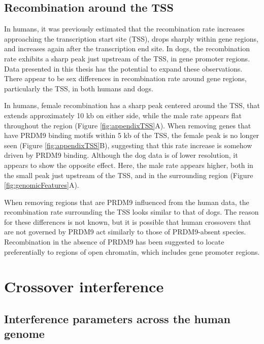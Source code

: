 \subsection{Recombination around the TSS}

In humans, it was previously estimated that the recombination rate increases approaching the transcription start site (TSS), drops sharply within gene regions, and increases again after the transcription end site\cite{Mcvean2004,Myers2005,hapmap2007,Spencer2006,Kong2010}.
In dogs, the recombination rate exhibits a sharp peak just upstream of the TSS, in gene promoter regions\cite{Auton2013}.
Data presented in this thesis has the potential to expand these observations.
There appear to be sex differences in recombination rate around gene regions, particularly the TSS, in both humans and dogs.

In humans, female recombination has a sharp peak centered around the TSS, that extends approximately 10 kb on either side, while the male rate appears flat throughout the region (Figure \ref{fig:appendixTSS}A).
When removing genes that have PRDM9 binding motifs within 5 kb of the TSS, the female peak is no longer seen (Figure \ref{fig:appendixTSS}B), suggesting that this rate increase is somehow driven by PRDM9 binding.
Although the dog data is of lower resolution, it appears to show the opposite effect.
Here, the male rate appears higher, both in the small peak just upstream of the TSS, and in the surrounding region (Figure \ref{fig:genomicFeatures}A).

When removing regions that are PRDM9 influenced from the human data, the recombination rate surrounding the TSS looks similar to that of dogs.
The reason for these differences is not known, but it is possible that human crossovers that are not governed by PRDM9 act similarly to those of PRDM9-absent species.
Recombination in the absence of PRDM9 has been suggested to locate preferentially to regions of open chromatin, which includes gene promoter regions\cite{Auton2013,Singhal2015,Lam2015}.

\section{Crossover interference}

\subsection{Interference parameters across the human genome}

